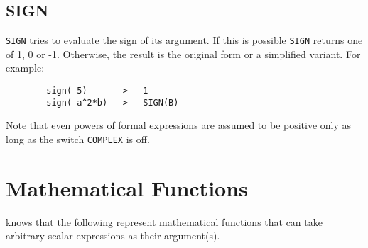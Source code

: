 \subsection{SIGN}
\hypertarget{operator:SIGN}{}
\texttt{SIGN} tries to evaluate the sign of its argument. If this
is possible \texttt{SIGN} returns one of 1, 0 or -1.  Otherwise, the result
is the original form or a simplified variant. For example:
\begin{verbatim}
        sign(-5)      ->  -1
        sign(-a^2*b)  ->  -SIGN(B)
\end{verbatim}
Note that even powers of formal expressions are assumed to be
positive only as long as the switch \texttt{COMPLEX} is off.

\section{Mathematical Functions}
\hypertarget{operator:ACOS}{}
\hypertarget{operator:ACOSH}{}
\hypertarget{operator:ACOT}{}
\hypertarget{operator:ACOTH}{}
\hypertarget{operator:ACSC}{}
\hypertarget{operator:ACSCH}{}
\hypertarget{operator:ASEC}{}
\hypertarget{operator:ASECH}{}
\hypertarget{operator:ASIN}{}
\hypertarget{operator:ASINH}{}
\hypertarget{operator:ATAN}{}
\hypertarget{operator:ATANH}{}
\hypertarget{operator:ATAN2}{}
\hypertarget{operator:COS}{}
\hypertarget{operator:COSH}{}
\hypertarget{operator:COT}{}
\hypertarget{operator:COTH}{}
\hypertarget{operator:CSC}{}
\hypertarget{operator:CSCH}{}
\hypertarget{operator:EXP}{}
\hypertarget{operator:HYPOT}{}
\hypertarget{operator:LOG}{}
\hypertarget{operator:LOGB}{}
\hypertarget{operator:LOG10}{}
\hypertarget{operator:SEC}{}
\hypertarget{operator:SECH}{}
\hypertarget{operator:SIN}{}
\hypertarget{operator:SINH}{}
\hypertarget{operator:SQRT}{}
\hypertarget{operator:TAN}{}
\hypertarget{operator:TANH}{}

{\REDUCE} knows that the following represent mathematical functions
 that can
take arbitrary scalar expressions as their argument(s).

